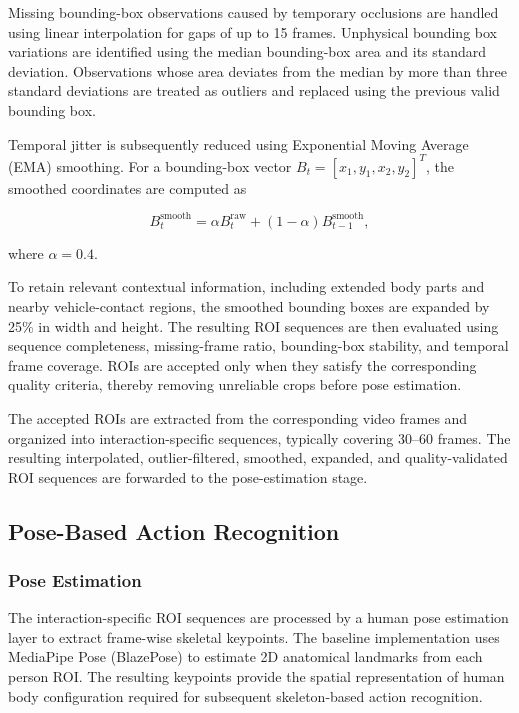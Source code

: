 \documentclass[conference]{IEEEtran}
\begin{document}
Missing bounding-box observations caused by temporary occlusions are handled
using linear interpolation for gaps of up to 15 frames. Unphysical bounding
box variations are identified using the median bounding-box area and its
standard deviation. Observations whose area deviates from the median by more
than three standard deviations are treated as outliers and replaced using
the previous valid bounding box.

Temporal jitter is subsequently reduced using Exponential Moving Average
(EMA) smoothing. For a bounding-box vector
$B_t=[x_1,y_1,x_2,y_2]^T$, the smoothed coordinates are computed as

\begin{equation}
B_t^{\mathrm{smooth}}
=
\alpha B_t^{\mathrm{raw}}
+
(1-\alpha)B_{t-1}^{\mathrm{smooth}},
\end{equation}

where $\alpha=0.4$.

To retain relevant contextual information, including extended body parts
and nearby vehicle-contact regions, the smoothed bounding boxes are
expanded by 25\% in width and height. The resulting ROI sequences are then
evaluated using sequence completeness, missing-frame ratio, bounding-box
stability, and temporal frame coverage. ROIs are accepted only when they
satisfy the corresponding quality criteria, thereby removing unreliable
crops before pose estimation.

The accepted ROIs are extracted from the corresponding video frames and
organized into interaction-specific sequences, typically covering
30--60 frames. The resulting interpolated, outlier-filtered, smoothed,
expanded, and quality-validated ROI sequences are forwarded to the
pose-estimation stage.

\subsection{Pose-Based Action Recognition}
\subsubsection{Pose Estimation}

The interaction-specific ROI sequences are processed by a human pose
estimation layer to extract frame-wise skeletal keypoints. The baseline
implementation uses MediaPipe Pose (BlazePose) \cite{mediapipe}  to estimate 2D anatomical
landmarks from each person ROI. The resulting keypoints provide the
spatial representation of human body configuration required for
subsequent skeleton-based action recognition.
\end{document}
